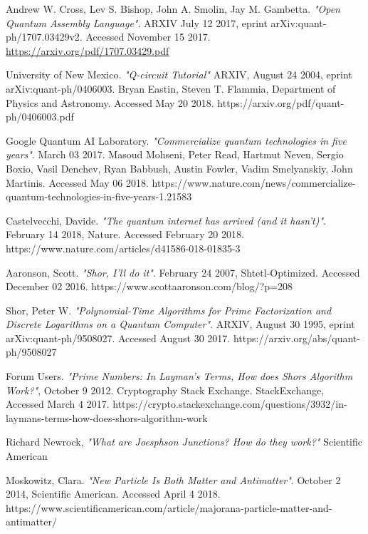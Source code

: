 \documentclass[a4paper]{article}
\begin{document}
\begin{thebibliography}{9}
	Andrew W. Cross, Lev S. Bishop, John A. Smolin, Jay M. Gambetta. \emph{"Open Quantum Assembly Language"}. ARXIV July 12 2017, eprint arXiv:quant-ph/1707.03429v2. Accessed November 15 2017. \href{https://arxiv.org/pdf/1707.03429.pdf}{https://arxiv.org/pdf/1707.03429.pdf}

	University of New Mexico. \emph{"Q-circuit Tutorial"} ARXIV, August 24 2004, eprint arXiv:quant-ph/0406003. Bryan Eastin, Steven T. Flammia, Department of Physics and Astronomy. Accessed May 20 2018. https://arxiv.org/pdf/quant-ph/0406003.pdf 

	Google Quantum AI Laboratory. \emph{"Commercialize quantum technologies in five years"}. March 03 2017. Masoud Mohseni, Peter Read, Hartmut Neven, Sergio Boxio, Vasil Denchev, Ryan Babbush, Austin Fowler, Vadim Smelyanskiy, John Martinis.  Accessed May 06 2018.  https://www.nature.com/news/commercialize-quantum-technologies-in-five-years-1.21583

	Castelvecchi, Davide. \emph{"The quantum internet has arrived (and it hasn’t)"}.  February 14 2018, Nature.  Accessed February 20 2018. https://www.nature.com/articles/d41586-018-01835-3

	Aaronson, Scott. \emph{"Shor, I'll do it"}. February 24 2007, Shtetl-Optimized. Accessed December 02 2016. https://www.scottaaronson.com/blog/?p=208

	Shor, Peter W. \emph{"Polynomial-Time Algorithms for Prime Factorization and Discrete Logarithms on a Quantum Computer"}. ARXIV, August 30 1995, eprint arXiv:quant-ph/9508027. Accessed August 30 2017. https://arxiv.org/abs/quant-ph/9508027   

	Forum Users. \emph{"Prime Numbers: In Layman's Terms, How does Shors Algorithm Work?"}, October 9 2012. Cryptography Stack Exchange.  StackExchange, Accessed March 4 2017. https://crypto.stackexchange.com/questions/3932/in-laymans-terms-how-does-shors-algorithm-work

	Richard Newrock,
	\emph{"What are Joesphson Junctions? How do they work?"}
	Scientific American
	
	Moskowitz, Clara. \emph{"New Particle Is Both Matter and Antimatter"}. October 2 2014, Scientific American. Accessed April 4 2018. https://www.scientificamerican.com/article/majorana-particle-matter-and-antimatter/


\end{thebibliography}
\end{document}
